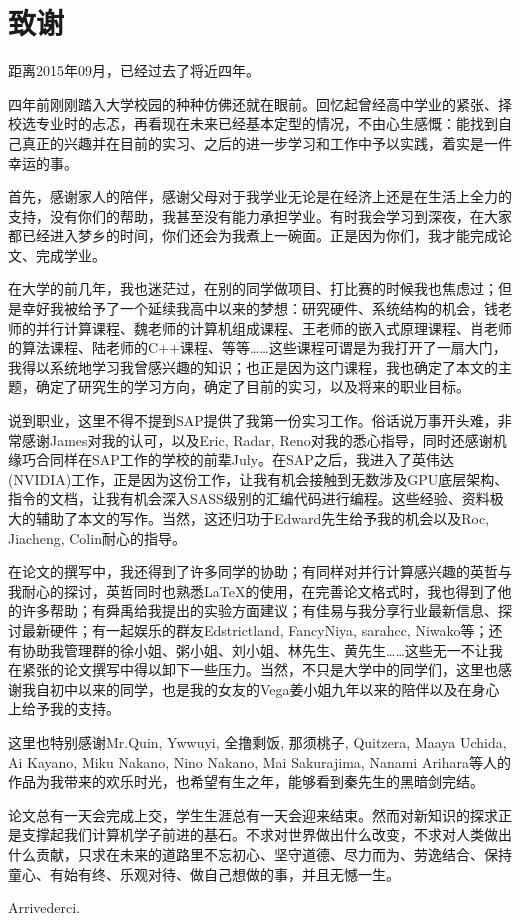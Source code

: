\clearpage                              %
\section*{致谢}                         %
\par 距离2015年09月，已经过去了将近四年。
\par 四年前刚刚踏入大学校园的种种仿佛还就在眼前。回忆起曾经高中学业的紧张、择校选专业时的忐忑，再看现在未来已经基本定型的情况，不由心生感慨：能找到自己真正的兴趣并在目前的实习、之后的进一步学习和工作中予以实践，着实是一件幸运的事。
\par 首先，感谢家人的陪伴，感谢父母对于我学业无论是在经济上还是在生活上全力的支持，没有你们的帮助，我甚至没有能力承担学业。有时我会学习到深夜，在大家都已经进入梦乡的时间，你们还会为我煮上一碗面。正是因为你们，我才能完成论文、完成学业。
\par 在大学的前几年，我也迷茫过，在别的同学做项目、打比赛的时候我也焦虑过；但是幸好我被给予了一个延续我高中以来的梦想：研究硬件、系统结构的机会，钱老师的并行计算课程、魏老师的计算机组成课程、王老师的嵌入式原理课程、肖老师的算法课程、陆老师的C++课程、等等……这些课程可谓是为我打开了一扇大门，我得以系统地学习我曾感兴趣的知识；也正是因为这门课程，我也确定了本文的主题，确定了研究生的学习方向，确定了目前的实习，以及将来的职业目标。
\par 说到职业，这里不得不提到SAP提供了我第一份实习工作。俗话说万事开头难，非常感谢James对我的认可，以及Eric, Radar, Reno对我的悉心指导，同时还感谢机缘巧合同样在SAP工作的学校的前辈July。在SAP之后，我进入了英伟达(NVIDIA)工作，正是因为这份工作，让我有机会接触到无数涉及GPU底层架构、指令的文档，让我有机会深入SASS级别的汇编代码进行编程。这些经验、资料极大的辅助了本文的写作。当然，这还归功于Edward先生给予我的机会以及Roc, Jiacheng, Colin耐心的指导。
\par 在论文的撰写中，我还得到了许多同学的协助；有同样对并行计算感兴趣的英哲与我耐心的探讨，英哲同时也熟悉\LaTeX 的使用，在完善论文格式时，我也得到了他的许多帮助；有舜禹给我提出的实验方面建议；有佳易与我分享行业最新信息、探讨最新硬件；有一起娱乐的群友Edstrictland, FancyNiya, sarahcc, Niwako等；还有协助我管理群的徐小姐、粥小姐、刘小姐、林先生、黄先生……这些无一不让我在紧张的论文撰写中得以卸下一些压力。当然，不只是大学中的同学们，这里也感谢我自初中以来的同学，也是我的女友的Vega姜小姐九年以来的陪伴以及在身心上给予我的支持。
\par 这里也特别感谢Mr.Quin, Ywwuyi, 全撸剩饭, 那须桃子, Quitzera, Maaya Uchida, Ai Kayano, Miku Nakano, Nino Nakano, Mai Sakurajima, Nanami Arihara等人的作品为我带来的欢乐时光，也希望有生之年，能够看到秦先生的黑暗剑完结。
\par 论文总有一天会完成上交，学生生涯总有一天会迎来结束。然而对新知识的探求正是支撑起我们计算机学子前进的基石。不求对世界做出什么改变，不求对人类做出什么贡献，只求在未来的道路里不忘初心、坚守道德、尽力而为、劳逸结合、保持童心、有始有终、乐观对待、做自己想做的事，并且无憾一生。
\par Arrivederci.
